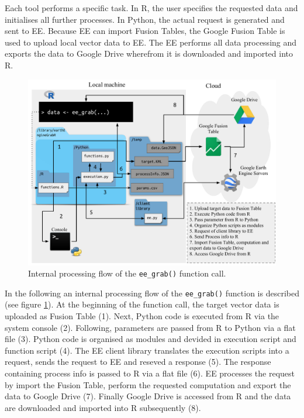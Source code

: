 Each tool performs a specific task. In R, the user specifies the requested data and initialises all further processes. In Python, the actual request is generated and sent to EE. Because EE can import Fusion Tables, the Google Fusion Table is used to upload local vector data to EE. The EE performs all data processing and exports the data to Google Drive wherefrom it is downloaded and imported into R. 

\begin{center}
	
	\begin{figure}[h]
		\begin{center}
			\includegraphics[width=15cm]{images/processing_flow_big.pdf}
			\caption{Internal processing flow of the \texttt{ee\_grab()} function call.}
			\label{processingFlow}
		\end{center}
	\end{figure}
\end{center}

In the following an internal processing flow of the \texttt{ee\_grab()} function is described (see figure \ref{processingFlow}).
At the beginning of the function call, the target vector data is uploaded as Fusion Table (1). Next, Python code is executed from R via the system console (2). 
Following, parameters are passed from R to Python via a flat file (3). Python code is organised as modules and devided in execution script and function script (4). The EE client library translates the execution scripts into a request, sends the request to EE  and reseved a response (5). The response containing process info is passed to R via a flat file (6). EE processes the request by import the Fusion Table, perform the requested computation and export the data to Google Drive (7).
Finally Google Drive is accessed from R and the data are downloaded and imported into R subsequently (8).

